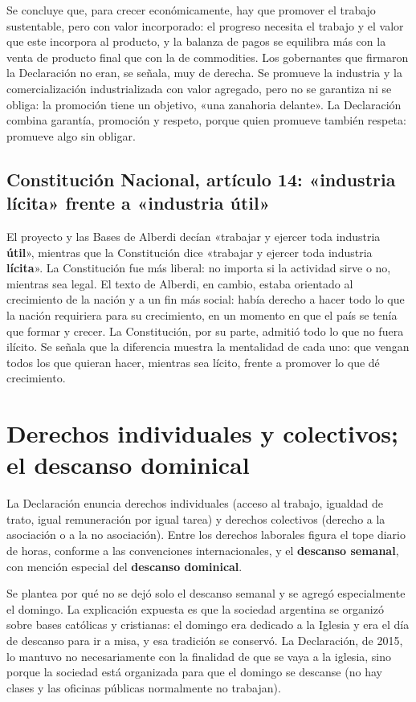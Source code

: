\documentclass[12pt,oneside]{book}
\begin{document}
Se concluye que, para crecer económicamente, hay que promover el trabajo sustentable, pero con valor incorporado: el progreso necesita el trabajo y el valor que este incorpora al producto, y la balanza de pagos se equilibra más con la venta de producto final que con la de commodities. Los gobernantes que firmaron la Declaración no eran, se señala, muy de derecha. Se promueve la industria y la comercialización industrializada con valor agregado, pero no se garantiza ni se obliga: la promoción tiene un objetivo, «una zanahoria delante». La Declaración combina garantía, promoción y respeto, porque quien promueve también respeta: promueve algo sin obligar.

\subsection*{Constitución Nacional, artículo 14: «industria lícita» frente a «industria útil»}

El proyecto y las Bases de Alberdi decían «trabajar y ejercer toda industria \textbf{útil}», mientras que la Constitución dice «trabajar y ejercer toda industria \textbf{lícita}». La Constitución fue más liberal: no importa si la actividad sirve o no, mientras sea legal. El texto de Alberdi, en cambio, estaba orientado al crecimiento de la nación y a un fin más social: había derecho a hacer todo lo que la nación requiriera para su crecimiento, en un momento en que el país se tenía que formar y crecer. La Constitución, por su parte, admitió todo lo que no fuera ilícito. Se señala que la diferencia muestra la mentalidad de cada uno: que vengan todos los que quieran hacer, mientras sea lícito, frente a promover lo que dé crecimiento.

\section{Derechos individuales y colectivos; el descanso dominical}

La Declaración enuncia derechos individuales (acceso al trabajo, igualdad de trato, igual remuneración por igual tarea) y derechos colectivos (derecho a la asociación o a la no asociación). Entre los derechos laborales figura el tope diario de horas, conforme a las convenciones internacionales, y el \textbf{descanso semanal}, con mención especial del \textbf{descanso dominical}.

Se plantea por qué no se dejó solo el descanso semanal y se agregó especialmente el domingo. La explicación expuesta es que la sociedad argentina se organizó sobre bases católicas y cristianas: el domingo era dedicado a la Iglesia y era el día de descanso para ir a misa, y esa tradición se conservó. La Declaración, de 2015, lo mantuvo no necesariamente con la finalidad de que se vaya a la iglesia, sino porque la sociedad está organizada para que el domingo se descanse (no hay clases y las oficinas públicas normalmente no trabajan).
\end{document}
